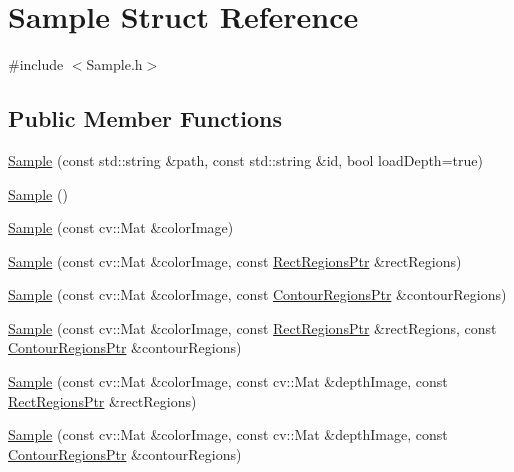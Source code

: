\hypertarget{struct_sample}{}\section{Sample Struct Reference}
\label{struct_sample}


{\ttfamily \#include $<$Sample.\+h$>$}

\subsection*{Public Member Functions}
\begin{DoxyCompactItemize}
\item 
\hyperlink{struct_sample_a01a02e244812649a05144cca680a06bb}{Sample} (const std\+::string \&path, const std\+::string \&id, bool load\+Depth=true)
\item 
\hyperlink{struct_sample_a48a4cf559a1ff65b7d4776c262236e27}{Sample} ()
\item 
\hyperlink{struct_sample_a18364a41c55332c945504818d159f92c}{Sample} (const cv\+::\+Mat \&color\+Image)
\item 
\hyperlink{struct_sample_a54afae9ec8fb587733d941a9adbf701a}{Sample} (const cv\+::\+Mat \&color\+Image, const \hyperlink{_rect_regions_8h_af395a1050a923eecf6862568feaf5d1d}{Rect\+Regions\+Ptr} \&rect\+Regions)
\item 
\hyperlink{struct_sample_acf65866ea4db2e2e112ba93d5f6d52d7}{Sample} (const cv\+::\+Mat \&color\+Image, const \hyperlink{_contour_regions_8h_a3a7590ecfb061e3c09270d38b53671ef}{Contour\+Regions\+Ptr} \&contour\+Regions)
\item 
\hyperlink{struct_sample_a9a059f41dae3c5f434ab2f5477d0ee8b}{Sample} (const cv\+::\+Mat \&color\+Image, const \hyperlink{_rect_regions_8h_af395a1050a923eecf6862568feaf5d1d}{Rect\+Regions\+Ptr} \&rect\+Regions, const \hyperlink{_contour_regions_8h_a3a7590ecfb061e3c09270d38b53671ef}{Contour\+Regions\+Ptr} \&contour\+Regions)
\item 
\hyperlink{struct_sample_a4e51a8f368870b1d15bd44d52df31643}{Sample} (const cv\+::\+Mat \&color\+Image, const cv\+::\+Mat \&depth\+Image, const \hyperlink{_rect_regions_8h_af395a1050a923eecf6862568feaf5d1d}{Rect\+Regions\+Ptr} \&rect\+Regions)
\item 
\hyperlink{struct_sample_ae36ef0947cd02feb71d9d933bec1b3d9}{Sample} (const cv\+::\+Mat \&color\+Image, const cv\+::\+Mat \&depth\+Image, const \hyperlink{_contour_regions_8h_a3a7590ecfb061e3c09270d38b53671ef}{Contour\+Regions\+Ptr} \&contour\+Regions)
\item 

\end{DoxyCompactItemize}
